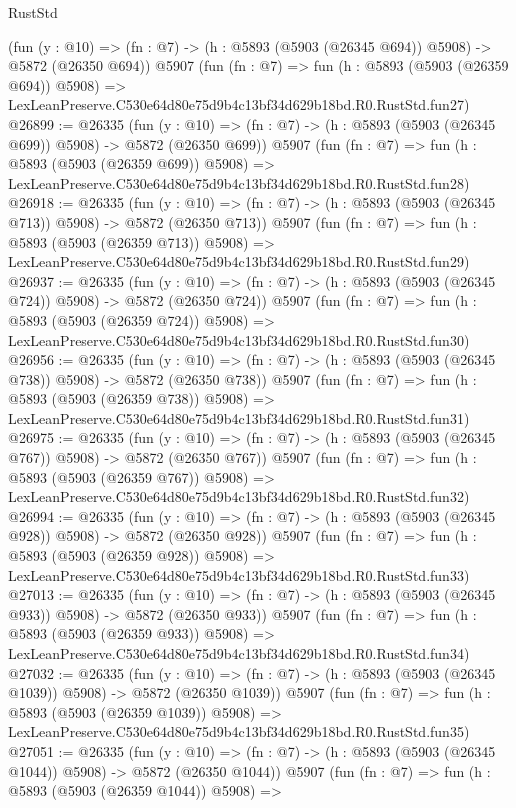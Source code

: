 \begin{lexlean}{RustStd}
\begin{coremodule}
    (fun (y : @10) => (fn : @7) -> (h : @5893 (@5903 (@26345 @694)) @5908) -> @5872 (@26350 @694))
    @5907
    (fun (fn : @7) =>
    fun (h : @5893 (@5903 (@26359 @694)) @5908) =>
    LexLeanPreserve.C530e64d80e75d9b4c13bf34d629b18bd.R0.RustStd.fun27)
@26899 := @26335
    (fun (y : @10) => (fn : @7) -> (h : @5893 (@5903 (@26345 @699)) @5908) -> @5872 (@26350 @699))
    @5907
    (fun (fn : @7) =>
    fun (h : @5893 (@5903 (@26359 @699)) @5908) =>
    LexLeanPreserve.C530e64d80e75d9b4c13bf34d629b18bd.R0.RustStd.fun28)
@26918 := @26335
    (fun (y : @10) => (fn : @7) -> (h : @5893 (@5903 (@26345 @713)) @5908) -> @5872 (@26350 @713))
    @5907
    (fun (fn : @7) =>
    fun (h : @5893 (@5903 (@26359 @713)) @5908) =>
    LexLeanPreserve.C530e64d80e75d9b4c13bf34d629b18bd.R0.RustStd.fun29)
@26937 := @26335
    (fun (y : @10) => (fn : @7) -> (h : @5893 (@5903 (@26345 @724)) @5908) -> @5872 (@26350 @724))
    @5907
    (fun (fn : @7) =>
    fun (h : @5893 (@5903 (@26359 @724)) @5908) =>
    LexLeanPreserve.C530e64d80e75d9b4c13bf34d629b18bd.R0.RustStd.fun30)
@26956 := @26335
    (fun (y : @10) => (fn : @7) -> (h : @5893 (@5903 (@26345 @738)) @5908) -> @5872 (@26350 @738))
    @5907
    (fun (fn : @7) =>
    fun (h : @5893 (@5903 (@26359 @738)) @5908) =>
    LexLeanPreserve.C530e64d80e75d9b4c13bf34d629b18bd.R0.RustStd.fun31)
@26975 := @26335
    (fun (y : @10) => (fn : @7) -> (h : @5893 (@5903 (@26345 @767)) @5908) -> @5872 (@26350 @767))
    @5907
    (fun (fn : @7) =>
    fun (h : @5893 (@5903 (@26359 @767)) @5908) =>
    LexLeanPreserve.C530e64d80e75d9b4c13bf34d629b18bd.R0.RustStd.fun32)
@26994 := @26335
    (fun (y : @10) => (fn : @7) -> (h : @5893 (@5903 (@26345 @928)) @5908) -> @5872 (@26350 @928))
    @5907
    (fun (fn : @7) =>
    fun (h : @5893 (@5903 (@26359 @928)) @5908) =>
    LexLeanPreserve.C530e64d80e75d9b4c13bf34d629b18bd.R0.RustStd.fun33)
@27013 := @26335
    (fun (y : @10) => (fn : @7) -> (h : @5893 (@5903 (@26345 @933)) @5908) -> @5872 (@26350 @933))
    @5907
    (fun (fn : @7) =>
    fun (h : @5893 (@5903 (@26359 @933)) @5908) =>
    LexLeanPreserve.C530e64d80e75d9b4c13bf34d629b18bd.R0.RustStd.fun34)
@27032 := @26335
    (fun (y : @10) => (fn : @7) -> (h : @5893 (@5903 (@26345 @1039)) @5908) -> @5872 (@26350 @1039))
    @5907
    (fun (fn : @7) =>
    fun (h : @5893 (@5903 (@26359 @1039)) @5908) =>
    LexLeanPreserve.C530e64d80e75d9b4c13bf34d629b18bd.R0.RustStd.fun35)
@27051 := @26335
    (fun (y : @10) => (fn : @7) -> (h : @5893 (@5903 (@26345 @1044)) @5908) -> @5872 (@26350 @1044))
    @5907
    (fun (fn : @7) =>
    fun (h : @5893 (@5903 (@26359 @1044)) @5908) =>

\end{coremodule}
\end{lexlean}
